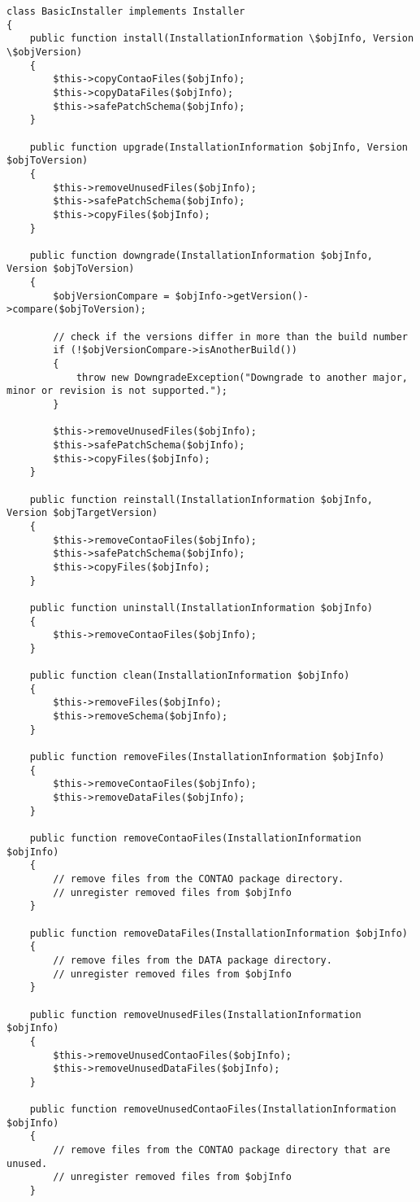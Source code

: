 \begin{lstlisting}[caption=Basic Installer Implementation Code]
class BasicInstaller implements Installer
{
	public function install(InstallationInformation \$objInfo, Version \$objVersion)
	{
		$this->copyContaoFiles($objInfo);
		$this->copyDataFiles($objInfo);
		$this->safePatchSchema($objInfo);
	}
	
	public function upgrade(InstallationInformation $objInfo, Version $objToVersion)
	{
		$this->removeUnusedFiles($objInfo);
		$this->safePatchSchema($objInfo);
		$this->copyFiles($objInfo);
	}
	
	public function downgrade(InstallationInformation $objInfo, Version $objToVersion)
	{
		$objVersionCompare = $objInfo->getVersion()->compare($objToVersion);
		
		// check if the versions differ in more than the build number
		if (!$objVersionCompare->isAnotherBuild())
		{
			throw new DowngradeException("Downgrade to another major, minor or revision is not supported.");
		}
		
		$this->removeUnusedFiles($objInfo);
		$this->safePatchSchema($objInfo);
		$this->copyFiles($objInfo);
	}
	
	public function reinstall(InstallationInformation $objInfo, Version $objTargetVersion)
	{
		$this->removeContaoFiles($objInfo);
		$this->safePatchSchema($objInfo);
		$this->copyFiles($objInfo);
	}
	
	public function uninstall(InstallationInformation $objInfo)
	{
		$this->removeContaoFiles($objInfo);
	}
	
	public function clean(InstallationInformation $objInfo)
	{
		$this->removeFiles($objInfo);
		$this->removeSchema($objInfo);
	}
	
	public function removeFiles(InstallationInformation $objInfo)
	{
		$this->removeContaoFiles($objInfo);
		$this->removeDataFiles($objInfo);
	}
	
	public function removeContaoFiles(InstallationInformation $objInfo)
	{
		// remove files from the CONTAO package directory.
		// unregister removed files from $objInfo
	}
	
	public function removeDataFiles(InstallationInformation $objInfo)
	{
		// remove files from the DATA package directory.
		// unregister removed files from $objInfo
	}
	
	public function removeUnusedFiles(InstallationInformation $objInfo)
	{
		$this->removeUnusedContaoFiles($objInfo);
		$this->removeUnusedDataFiles($objInfo);
	}
	
	public function removeUnusedContaoFiles(InstallationInformation $objInfo)
	{
		// remove files from the CONTAO package directory that are unused.
		// unregister removed files from $objInfo
	}
	

\end{lstlisting}
